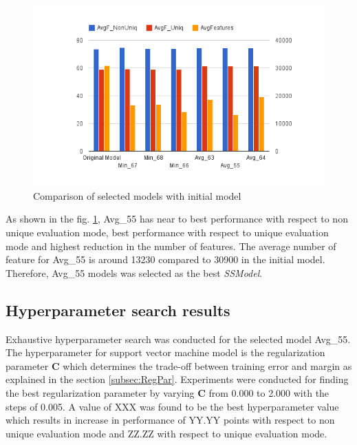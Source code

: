 \begin{figure}
\centering
\includegraphics[scale=0.6]{figures/6ModelsComparison.png}
\caption{Comparison of selected models with initial model}\label{fig:6ModelsComp}
\end{figure}

As shown in the fig. \ref{fig:6ModelsComp}, Avg\_55 has near to best performance with respect to non unique evaluation mode, best performance with respect to unique evaluation mode and highest reduction in the number of features. The average number of feature for Avg\_55 is around 13230 compared to 30900 in the initial model. Therefore, Avg\_55 models was selected as the best \textit{SSModel}.


\subsection{Hyperparameter search results}

Exhaustive hyperparameter search was conducted for the selected model Avg\_55. The hyperparameter for support vector machine model is the regularization parameter $\mathbf{C}$ which determines the trade-off between training error and margin as explained in the section \ref{subsec:RegPar}. Experiments were conducted for finding the best regularization parameter by varying $\mathbf{C}$ from 0.000 to 2.000 with the steps of 0.005. A value of XXX was found to be the best hyperparameter value which results in increase in performance of YY.YY points with respect to non unique evaluation mode and ZZ.ZZ with respect to unique evaluation mode.

